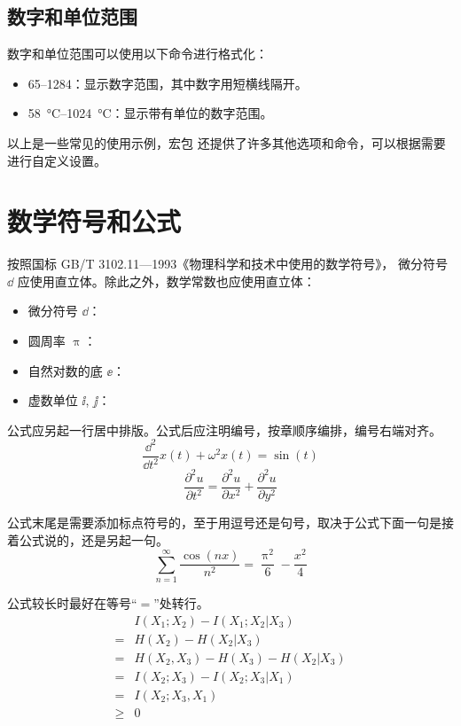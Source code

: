 \subsection*{数字和单位范围}

数字和单位范围可以使用以下命令进行格式化：

\begin{itemize}
  \item \numrange{65}{1284}：显示数字范围，其中数字用短横线隔开。
  \item \SIrange{58}{1024}{\degreeCelsius}：显示带有单位的数字范围。
\end{itemize}

以上是一些常见的使用示例，宏包  还提供了许多其他选项和命令，可以根据需要进行自定义设置。

\section{数学符号和公式}

按照国标 GB/T 3102.11—1993《物理科学和技术中使用的数学符号》，
微分符号 $\dd$ 应使用直立体。除此之外，数学常数也应使用直立体：
\begin{itemize}
  \item 微分符号 $\dd$：
  \item 圆周率 $\uppi$：
  \item 自然对数的底 $\ee$：
  \item 虚数单位 $\ii$, $\jj$： 
\end{itemize}

公式应另起一行居中排版。公式后应注明编号，按章顺序编排，编号右端对齐。
\begin{equation}
  \frac{\dd^2}{\dd t^2}x(t)+\omega^2x(t)=\sin(t)
\end{equation}
\begin{equation}
  \frac{\partial^2u}{\partial t^2}=\frac{\partial^2u}{\partial x^2}+\frac{\partial^2u}{\partial y^2}
\end{equation}

公式末尾是需要添加标点符号的，至于用逗号还是句号，取决于公式下面一句是接着公式说的，还是另起一句。
\begin{equation}
  \sum_{n=1}^{\infty}\frac{\cos(nx)}{n^2}=\frac{\uppi^2}{6}-\frac{x^2}{4}
\end{equation}

公式较长时最好在等号“$=$”处转行。
\begin{align}
       & I(X_1;X_2)-I(X_1;X_2|X_3) \nonumber    \\
  =    & H(X_2)-H(X_2|X_3) \nonumber            \\
  =    & H(X_2,X_3)-H(X_3)-H(X_2|X_3) \nonumber \\
  =    & I(X_2;X_3)-I(X_2;X_3|X_1) \nonumber    \\
  =    & I(X_2;X_3,X_1) \nonumber               \\
  \geq & 0
\end{align}

